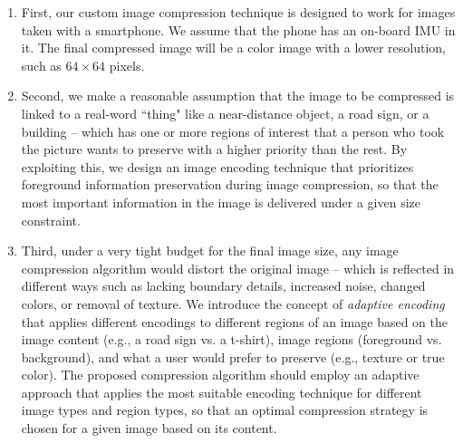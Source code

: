 \begin{enumerate}%

	\vspace{.5em}
	\item First, our custom image compression technique is designed to work for images taken with a smartphone. We assume that the phone has an on-board IMU in it. The final compressed image will be a color image with a lower resolution, such as $64 \times 64$ pixels.

	\vspace{.5em}
	\item Second, we make a reasonable assumption that the image to be compressed is linked to a real-word ``thing" like a near-distance object, a road sign, or a building -- which has one or more regions of interest that a person who took the picture wants to preserve with a higher priority than the rest. By exploiting this, we design an image encoding technique that prioritizes foreground information preservation during image compression, so that the most important information in the image is delivered under a given size constraint.



	\vspace{.5em}
	\item Third, under a very tight budget for the final image size, any image compression algorithm would distort the original image -- which is reflected in different ways such as lacking boundary details, increased noise, changed colors, or removal of texture. We introduce the concept of \textit{adaptive encoding} that applies different encodings to different regions of an image based on the image content (e.g., a road sign vs. a t-shirt), image regions (foreground vs. background), and what a user would prefer to preserve (e.g., texture or true color). The proposed compression algorithm should employ an adaptive approach that applies the most suitable encoding technique for different image types and region types, so that an optimal compression strategy is chosen for a given image based on its content.


\end{enumerate}
